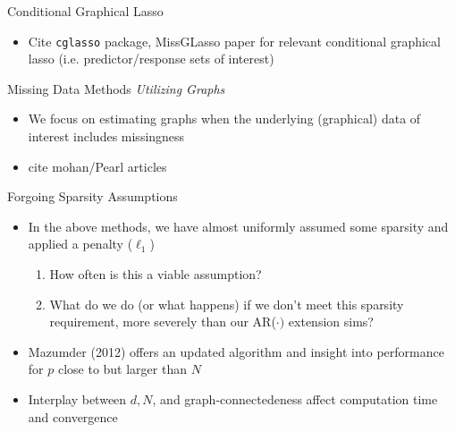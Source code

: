 \documentclass{beamer}
\begin{document}
\begin{frame}{Conditional Graphical Lasso}
    \begin{itemize}
        \item Cite \texttt{cglasso} package, MissGLasso paper for relevant conditional graphical lasso (i.e. predictor/response sets of interest)
    \end{itemize}
\end{frame}


\begin{frame}{Missing Data Methods {\it Utilizing Graphs}}
    \begin{itemize}
        \item We focus on estimating graphs when the underlying (graphical) data of interest includes missingness 
        \item cite mohan/Pearl articles
    \end{itemize}
\end{frame}
    
\begin{frame}{Forgoing Sparsity Assumptions}
\begin{itemize}
\item In the above methods, we have almost uniformly assumed some sparsity and applied a penalty ($\ell_1$)
    \begin{enumerate}
        \item How often is this a viable assumption? 
        \item What do we do (or what happens) if we don't meet this sparsity requirement, more severely than our AR($\cdot)$ extension sims?  
    \end{enumerate}
\item     Mazumder (2012) \cite{mazumder_graphical_2012} offers an updated algorithm and insight into performance for $p$ close to but larger than $N$
\item Interplay between $d, N$, and graph-connectedeness affect computation time and convergence 
\end{itemize}
\end{frame}
\end{document}
